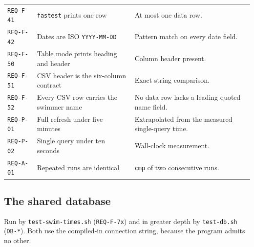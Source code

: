 \documentclass[12pt]{article}
\newcommand{\code}[1]{\texttt{#1}}
\newcommand{\req}[1]{\texttt{#1}}
\begin{document}
\begin{center}
\begin{longtable}{p{2.1cm}p{5.2cm}p{6.2cm}}
  \req{REQ-F-41} & \code{fastest} prints one row
    & At most one data row. \\
  \req{REQ-F-42} & Dates are ISO \code{YYYY-MM-DD}
    & Pattern match on every date field. \\
  \req{REQ-F-50} & Table mode prints heading and header
    & Column header present. \\
  \req{REQ-F-51} & CSV header is the six-column contract
    & Exact string comparison. \\
  \req{REQ-F-52} & Every CSV row carries the swimmer name
    & No data row lacks a leading quoted name field. \\
  \req{REQ-P-01} & Full refresh under five minutes
    & Extrapolated from the measured single-query time. \\
  \req{REQ-P-02} & Single query under ten seconds
    & Wall-clock measurement. \\
  \req{REQ-A-01} & Repeated runs are identical
    & \code{cmp} of two consecutive runs. \\
  \bottomrule
\end{longtable}
\end{center}

\subsection{The shared database}

Run by \code{test-swim-times.sh} (\req{REQ-F-7x}) and in greater depth
by \code{test-db.sh} (\req{DB-*}).  Both use the compiled-in connection
string, because the program admits no other.
\end{document}
